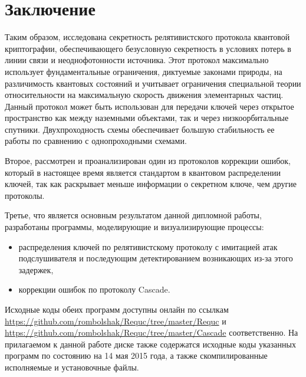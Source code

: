 \chapter*{Заключение}				%
Таким образом, исследована секретность релятивистского протокола квантовой криптографии, обеспечивающего безусловную секретность в условиях потерь в линии связи и неоднофотонности источника.
Этот протокол максимально использует фундаментальные ограничения, диктуемые законами природы, на различимость квантовых состояний и учитывает ограничения специальной теории относительности на максимальную скорость движения элементарных частиц. Данный протокол может быть использован для передачи ключей через открытое пространство как между наземными объектами, так и через низкоорбитальные спутники. Двухпроходность схемы обеспечивает большую стабильность ее работы по сравнению с однопроходными схемами.

Второе, рассмотрен и проанализирован один из протоколов коррекции ошибок, который в настоящее время является стандартом в квантовом распределении ключей, так как раскрывает меньше информации о секретном ключе, чем другие протоколы.

Третье, что является основным результатом данной дипломной работы, разработаны программы, моделирующие и визуализирующие процессы:
\begin{itemize}
  \item распределения ключей по релятивистскому протоколу с имитацией атак подслушивателя и последующим детектированием возникающих из-за этого задержек,
  \item коррекции ошибок по протоколу Cascade.
\end{itemize}
Исходные коды обеих программ доступны онлайн по ссылкам \url{https://github.com/rombolshak/Requc/tree/master/Requc} и \url{https://github.com/rombolshak/Requc/tree/master/Cascade} соответственно.
На прилагаемом к данной работе диске также содержатся исходные коды указанных программ по состоянию на 14 мая 2015 года, а также скомпилированные исполняемые и установочные файлы.


